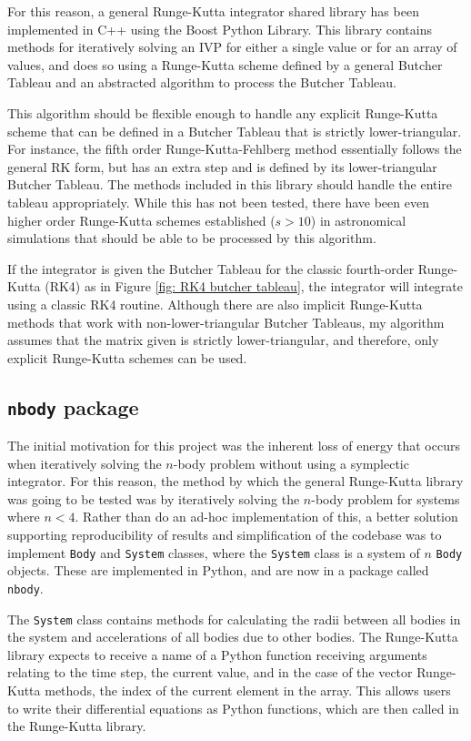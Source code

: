 \documentclass[onecolumn,titlepage,letterpaper,10pt]{article}
\begin{document}
For this reason, a general Runge-Kutta integrator shared library
has been implemented in C++ using the Boost Python Library. This library
contains methods for iteratively solving an IVP for either a single value or for
an array of values, and does so using a Runge-Kutta scheme defined by a
general Butcher Tableau and an abstracted algorithm to process the Butcher
Tableau.

This algorithm should be flexible enough to handle any explicit Runge-Kutta
scheme that can be defined in a Butcher Tableau that is strictly
lower-triangular. For instance, the fifth order Runge-Kutta-Fehlberg method
essentially follows the general RK form, but has an extra step and is defined
by its lower-triangular Butcher Tableau.
The methods included in this library should handle the entire tableau
appropriately. While this has not been tested, there have been even higher order
Runge-Kutta schemes established ($s> 10$) in astronomical simulations that
should be able to be processed by this algorithm.

If the integrator is given the Butcher Tableau for the classic
fourth-order Runge-Kutta (RK4) as in Figure \ref{fig: RK4 butcher tableau}, the
integrator will integrate using a classic RK4 routine.
Although there are also
implicit Runge-Kutta methods that work with non-lower-triangular Butcher Tableaus,
my algorithm assumes that the matrix given is strictly lower-triangular, and
therefore, only explicit Runge-Kutta schemes can be used.


\subsection{\texttt{nbody} package}
The initial motivation for this project was the inherent loss of energy that
occurs when iteratively solving the $n$-body problem without using a symplectic
integrator. For this reason, the method by which the general Runge-Kutta
library was going to be tested was by iteratively solving the $n$-body
problem for systems where $n < 4$. Rather than do an ad-hoc implementation of
this, a better solution supporting reproducibility of results and
simplification of the codebase was to implement \texttt{Body} and
\texttt{System} classes, where the \texttt{System} class is a system of $n$
\texttt{Body} objects. These are implemented in Python, and are now in a package
called \texttt{nbody}.

The \texttt{System} class contains methods for calculating the radii between all
bodies in the system and accelerations of all bodies due to other bodies.
The Runge-Kutta library expects to receive a name of a Python function receiving
arguments relating to the time step, the current value, and in the case of the
vector Runge-Kutta methods, the index of the current element in the array. This
allows users to write their differential equations as Python functions, which
are then called in the Runge-Kutta library.
\end{document}
